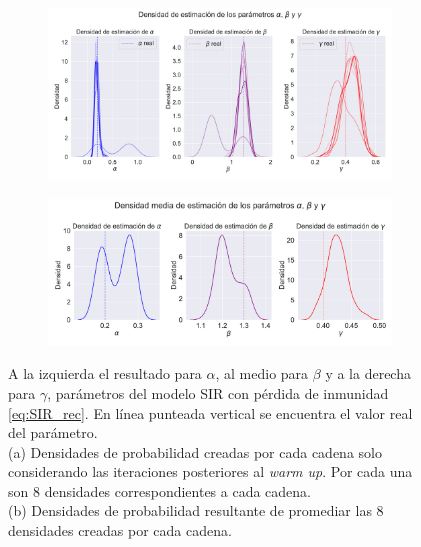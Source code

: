 \begin{figure}[h]
    \centering
    \begin{subfigure}[b]{0.8\textwidth}
        \includegraphics[width=\linewidth]{img/content/chapter4/nonlinear_filters_sir_rec_params_density.pdf}
    \caption{}
    \label{fig:nonlinear_filters_sir_rec_params_density}
    \end{subfigure}
    \begin{subfigure}[b]{0.8\textwidth}
        \includegraphics[width=\linewidth]{img/content/chapter4/nonlinear_filters_sir_rec_params_density_mean.pdf}
    \caption{}
    \label{fig:nonlinear_filters_sir_rec_params_density_mean}
    \end{subfigure}
    \caption{A la izquierda el resultado para $\alpha$, al medio para $\beta$ y a la derecha para $\gamma$, parámetros del modelo SIR con pérdida de inmunidad \eqref{eq:SIR_rec}. En línea punteada vertical se encuentra el valor real del parámetro. \\
    (a) Densidades de probabilidad creadas por cada cadena solo considerando las iteraciones posteriores al \textit{warm up}. Por cada una son $8$ densidades correspondientes a cada cadena. \\
    (b) Densidades de probabilidad resultante de promediar las $8$ densidades creadas por cada cadena.}
\end{figure}

